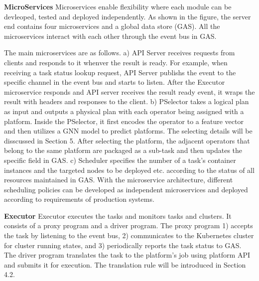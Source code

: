 
\textbf{MicroServices}
Microservices enable flexibility where each module can be devleoped, tested and deployed independently. 
As shown in the figure, the server end contains four microservices and a global data store (GAS).
All the microservices interact with each other through the event bus in GAS.

The main microservices are as follows. 
a) API Server receives requests from clients and responds to it whenver the result is ready. 
For example, when receiving a task status lookup request, API Server publishs the event to the specific channel in the event bus and starts to listen. 
After the Executor microservice responds and API server receives the result ready event, it wraps the result with headers and responses to the client. 
b) PSelector takes a logical plan as input and outputs a physical plan with each operator being assigned with a platform. 
Inside the PSelector, it first encodes the operator to a feature vector and then utilizes a GNN model to predict platforms. 
The selecting details will be disscussed in Section 5.
After selecting the platform, the adjacent operators that belong to the same platform are packaged as a sub-task and then updates the specific field in GAS.
c) Scheduler specifies the number of a task's container instances and the targeted nodes to be deployed etc. according to the status of all resources maintained in GAS.
With the microservice architecture, different scheduling policies can be developed as independent microservices and deployed according to requirements of production systems.

\textbf{Executor}
Executor executes the tasks and monitors tasks and clusters.
It consists of a proxy program and a driver program. 
The proxy program 
1) accepts the task by listening to the event bus, 
2) communicates to the Kubernetes cluster for cluster running states, 
and 3) periodically reports the task status to GAS.
The driver program translates the task to the platform's job using platform API and submits it for execution.
The translation rule will be introduced in Section 4.2.



